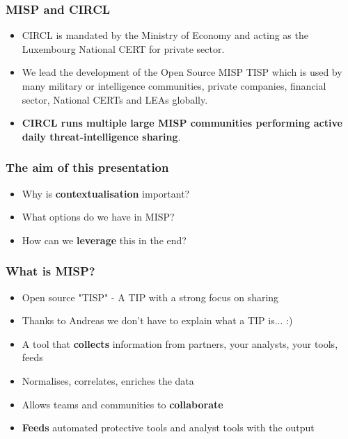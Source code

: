 
\begin{frame}
\titlepage
\end{frame}

\begin{frame}
  \frametitle{MISP and CIRCL}
  \begin{itemize}
    \item CIRCL is mandated by the Ministry of Economy and acting as the Luxembourg National CERT for private sector.
    \item We lead the development of the Open Source MISP TISP which is used by many military or intelligence communities, private companies, financial sector, National CERTs and LEAs globally.
    \item {\bf CIRCL runs multiple large MISP communities performing active daily threat-intelligence sharing}.
  \end{itemize}
\end{frame}

\begin{frame}
  \frametitle{The aim of this presentation}
  \begin{itemize}
     \item Why is {\bf contextualisation} important?
     \item What options do we have in MISP?
     \item How can we {\bf leverage} this in the end?
  \end{itemize}
\end{frame}

\begin{frame}
\frametitle{What is MISP?}
\begin{itemize}
       \item Open source "TISP" - A TIP with a strong focus on sharing
       \item Thanks to Andreas we don't have to explain what a TIP is... :) 
       \item A tool that {\bf collects} information from partners, your analysts, your tools, feeds
       \item Normalises, correlates, enriches the data
       \item Allows teams and communities to {\bf collaborate}
       \item {\bf Feeds} automated protective tools and analyst tools with the output
\end{itemize}
\end{frame}


